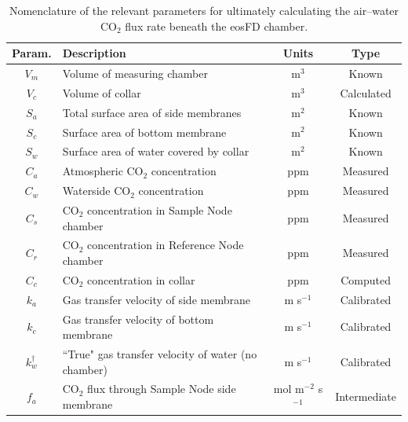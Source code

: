 \documentclass[11pt]{article}
\begin{document}
\begin{table}[H]
	\caption{Nomenclature of the relevant parameters for ultimately calculating the air--water CO$_2$ flux rate beneath the eosFD chamber.}
	\begin{tabularx}{\textwidth}{cXcc}
		\hline
		\textbf{Param.} & \textbf{Description} & \textbf{Units} & \textbf{Type} \\
		\hline
		
		$V_m$ & Volume of measuring chamber & m$^3$ & Known\\
		
		$V_c$ & Volume of collar & m$^3$ & Calculated\\
		
		$S_a$ & Total surface area of side membranes & m$^2$ & Known\\
		
		$S_c$ & Surface area of bottom membrane & m$^2$ & Known \\
		
		$S_w$ & Surface area of water covered by collar & m$^2$ & Known \\
		
		$C_a$ & Atmospheric CO$_2$ concentration & ppm & Measured \\
		
		$C_w$ & Waterside CO$_2$ concentration & ppm & Measured \\
		
		$C_s$ & CO$_2$ concentration in Sample Node chamber & ppm & Measured \\
		
		$C_r$ & CO$_2$ concentration in Reference Node chamber & ppm & Measured \\
		
		$C_c$ & CO$_2$ concentration in collar & ppm & Computed \\
			
		$k_a$ & Gas transfer velocity of side membrane & m s$^{-1}$ & Calibrated \\
		
		$k_c$ & Gas transfer velocity of bottom membrane & m s$^{-1}$ & Calibrated \\
		
		
		$k_w^\dagger$ & ``True" gas transfer velocity of water (no chamber) & m s$^{-1}$ & Calibrated \\
		
		$f_a$ & CO$_2$ flux through Sample Node side membrane & mol m$^{-2}$ s$^{-1}$ & Intermediate \\
		

\end{tabularx}
\end{table}
\end{document}
